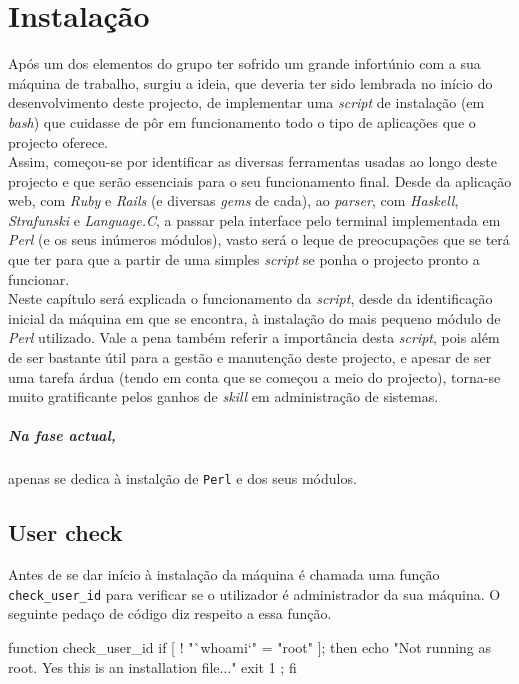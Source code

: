 \chapter{Instalação}\label{chap scriptinst}
\minitoc
Após um dos elementos do grupo ter sofrido um grande infortúnio com a sua máquina de trabalho, surgiu a ideia, que deveria ter sido lembrada no início do desenvolvimento deste projecto, 
de implementar uma \emph{script} de instalação (em \emph{bash}) que cuidasse de pôr em funcionamento todo o tipo de aplicações que o projecto oferece.\\

Assim, começou-se por identificar as diversas ferramentas usadas ao longo deste projecto e que serão essenciais para o seu funcionamento final. Desde da aplicação web, com \emph{Ruby} e 
\emph{Rails} (e diversas \emph{gems} de cada), ao \emph{parser}, com \emph{Haskell}, \emph{Strafunski} e \emph{Language.C}, a passar pela interface pelo terminal implementada em 
\emph{Perl} (e os seus inúmeros módulos), vasto será o leque de preocupações que se terá que ter para que a partir de uma simples \emph{script} se ponha o projecto pronto a funcionar.\\

Neste capítulo será explicada o funcionamento da \emph{script}, desde da identificação inicial da máquina em que se encontra, à instalação do mais pequeno módulo de \emph{Perl} utilizado.
Vale a pena também referir a importância desta \emph{script}, pois além de ser bastante útil para a gestão e manutenção deste projecto, e apesar de ser uma tarefa árdua (tendo em conta 
que se começou a meio do projecto), torna-se muito gratificante pelos ganhos de \emph{skill} em administração de sistemas.\\

\paragraph{Na fase actual,} apenas se dedica à instalção de \texttt{Perl} e dos seus módulos.

\section{User check}
Antes de se dar início à instalação da máquina é chamada uma função \texttt{check\_user\_id} para verificar se o utilizador é administrador da sua máquina. O seguinte pedaço de código 
diz respeito a essa função.

\begin{myxml}
 function check_user_id {
        if [ ! "`whoami`" = "root" ]; then
                echo "Not running as root. Yes this is an installation file..."
                exit 1 ;
        fi
}
\end{myxml}


